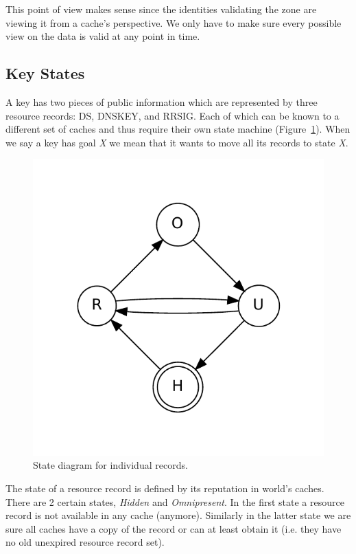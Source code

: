 \documentclass[twoside,english, a4paper]{article}
\begin{document}
This point of view makes sense since the identities validating the 
zone are viewing it from a cache's perspective. We only have to make 
sure every
possible view on the data is valid at any point in time.

\subsection{Key States} \label{sec:keystates}

A key has two pieces of public information which are 
represented by three resource records: DS, DNSKEY, and RRSIG. Each of 
which can be known to a different set of caches and thus require their
own state machine (Figure~\ref{fig:states}). When we say a key has 
goal \emph{X} we mean that it wants to move all its records to state
\emph{X}.

\begin{figure}[h]
	\centering
	\includegraphics[scale=0.5]{states.pdf}
	\caption{State diagram for individual records.}
	\label{fig:states}
\end{figure}

The state of a resource record is defined by its reputation in 
world's caches. There are 2 certain states, \emph{Hidden} and \emph
{Omnipresent}. In the first state a resource record is not available 
in any cache (anymore). Similarly in the latter state we are sure 
all caches have a copy of the record or can at least obtain it (i.e. 
they have no old unexpired resource record set).
\end{document}
